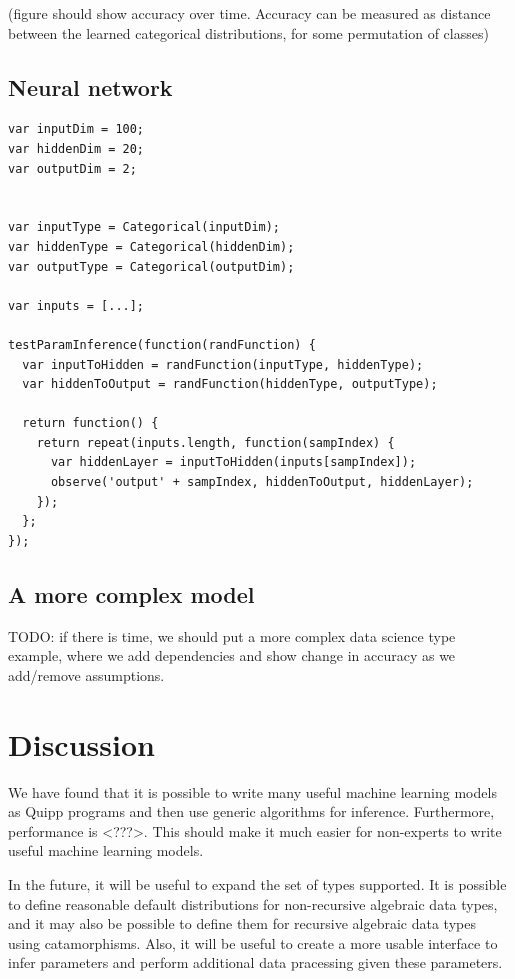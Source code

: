 \documentclass{article}
\begin{document}
(figure should show accuracy over time.  Accuracy can be measured as distance between the learned categorical distributions, for some permutation of classes)

\subsection{Neural network}

{\small
\begin{verbatim}
var inputDim = 100;
var hiddenDim = 20;
var outputDim = 2;


var inputType = Categorical(inputDim);
var hiddenType = Categorical(hiddenDim);
var outputType = Categorical(outputDim);

var inputs = [...];

testParamInference(function(randFunction) {
  var inputToHidden = randFunction(inputType, hiddenType);
  var hiddenToOutput = randFunction(hiddenType, outputType);

  return function() {
    return repeat(inputs.length, function(sampIndex) {
      var hiddenLayer = inputToHidden(inputs[sampIndex]);
      observe('output' + sampIndex, hiddenToOutput, hiddenLayer);
    });
  };
});
\end{verbatim}
}

\subsection{A more complex model}

TODO: if there is time, we should put a more complex data science type example, where we add dependencies and show change in accuracy as we add/remove assumptions.


  \section{Discussion}

  We have found that it is possible to write many useful machine learning models as Quipp programs and then use generic algorithms for inference.  Furthermore, performance is <???>.  This should make it much easier for non-experts to write useful machine learning models.
  
  In the future, it will be useful to expand the set of types supported.  It is possible to define reasonable default distributions for non-recursive algebraic data types, and it may also be possible to define them for recursive algebraic data types using catamorphisms.  Also, it will be useful to create a more usable interface to infer parameters and perform additional data pracessing given these parameters.

{}

\end{document}
